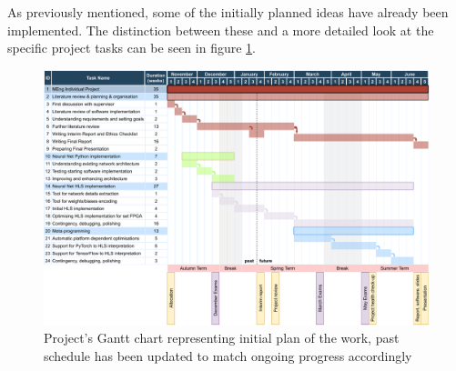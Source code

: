 As previously mentioned, some of the initially planned ideas have already been implemented. The distinction between these and a more detailed look at the specific
project tasks can be seen in figure \ref{fig:gantt-chart}.

\begin{figure}[hpt]
  \centering
  \includegraphics[trim={0cm 0cm 0cm 0cm}, width=1.2\textwidth, center]{project/gantt_chart.pdf}
  \caption{Project's Gantt chart representing initial plan of the work, past schedule has been updated to match ongoing progress accordingly}
  \label{fig:gantt-chart}
\end{figure}
